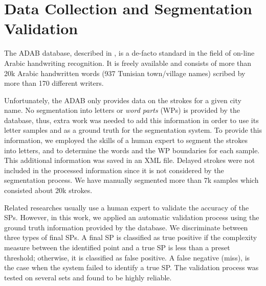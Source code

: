 \documentclass[10pt, conference, compsocconf]{IEEEtran}
\begin{document}
\section{Data Collection and Segmentation Validation}
\label{sec:data_collection_segmentation_validation}
The ADAB database, described in \cite{el2009icdar}, is a de-facto standard in the field of on-line Arabic handwriting recognition. 
It is freely available and consists of more than 20k Arabic handwritten words (937 Tunisian town/village names) scribed by more than 170 different writers. 

Unfortunately, the ADAB only provides data on the strokes for a given city name. 
No segmentation into letters or \emph{word parts} (WPs) is provided by the database, thus, extra work was needed to add this information in order to use its letter samples and as a ground truth for the segmentation system.
To provide this information, we employed the skills of a human expert to segment the strokes into letters, and to determine the words and the WP boundaries for each sample. 
This additional information was saved in an XML file. 
Delayed strokes were not included in the processed information since it is not considered by the segmentation process.
We have manually segmented more than 7k samples which consisted about 20k strokes.


Related researches usually use a human expert to validate the accuracy of the SPs. However, in this work, we applied an automatic validation process using the ground truth information provided by the database. We discriminate between three types of final SPs. A final SP is classified as true positive if the complexity measure between the identified point and a true SP is less than a preset threshold; otherwise, it is classified as false positive. A false negative (miss), is the case when the system failed to identify a true SP.
The validation process was tested on several sets and found to be highly reliable.

\end{document}
